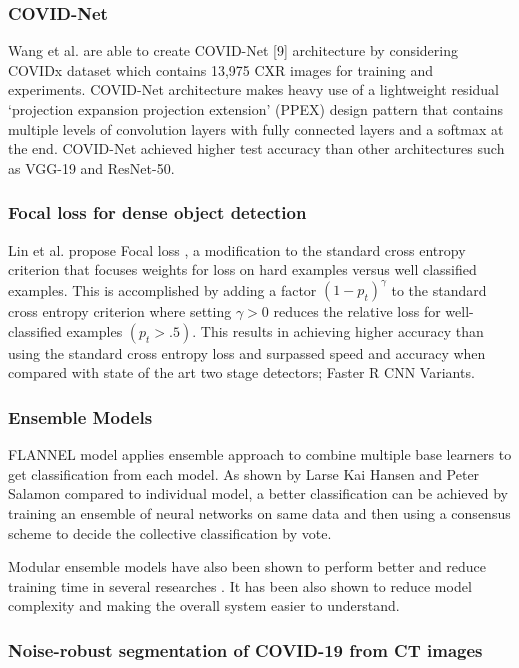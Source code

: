 \documentclass{sigkddExp}
\begin{document}
\subsubsection{COVID-Net}

Wang et al. are able to create COVID-Net [9] architecture by
considering COVIDx dataset which contains 13,975 CXR images for training and
experiments. COVID-Net architecture makes heavy use of a lightweight residual
‘projection expansion projection extension’ (PPEX) design pattern that contains
multiple levels of convolution layers with fully connected layers and a softmax
at the end. COVID-Net achieved higher test accuracy than other architectures
such as VGG-19 and ResNet-50.


\subsubsection{Focal loss for dense object detection}

Lin et al. propose Focal loss \cite{lin2018focal}, a
modification to the standard cross entropy criterion that focuses weights for
loss on hard examples versus well classified examples. This is accomplished by
adding a factor $(1 - p_t)^\gamma$ to the standard cross entropy criterion where
setting $\gamma  > 0$ reduces the relative loss for well-classified examples
$(p_t > .5)$. This results in achieving higher accuracy than using the standard
cross entropy loss and surpassed speed and accuracy when compared with state of
the art two stage detectors; Faster R CNN Variants.

\subsubsection{Ensemble Models}

FLANNEL model applies ensemble approach to combine multiple base learners to get
classification from each model. As shown by Larse Kai Hansen and Peter Salamon
\cite{58871} compared to individual model, a better classification can be achieved
by training an ensemble of neural networks on same data and then using a
consensus scheme to decide the collective classification by vote.

Modular ensemble models have also been shown to perform better and reduce
training time in several researches \cite{combine}. It has been also shown to
reduce model complexity and making the overall system easier to understand.


\subsubsection{Noise-robust segmentation of COVID-19 from CT images}
\end{document}
